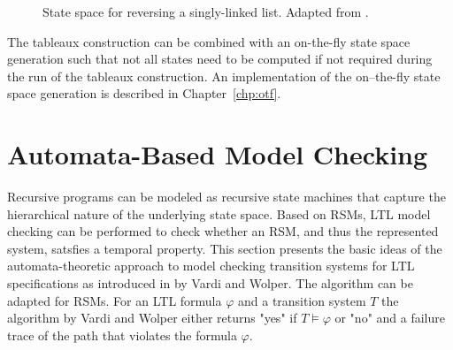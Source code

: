 \documentclass[a4paper, 12pt, twoside]{report}
\begin{document}
\begin{figure}[!h]
\begin{center}
{}
			\caption{State space for reversing a singly-linked list. Adapted from \cite{heinen2015verifyingPhd}.}\label{fig:reverseSLL_tableaux}
		\end{center}
	\end{figure}
	
	The tableaux construction can be combined with an on-the-fly state space generation such that not all states need to be computed if not required during the run of the tableaux construction. An implementation of the on--the-fly state space generation is described in Chapter~\ref{chp:otf}.
	
	\section{Automata-Based Model Checking}\label{sec:automataMC}
	
	Recursive programs can be modeled as recursive state machines that capture the hierarchical nature of the underlying state space. Based on RSMs, LTL model checking can be performed to check whether an RSM, and thus the represented system, satsfies a temporal property. This section presents the basic ideas of the automata-theoretic approach to model checking transition systems for LTL specifications as introduced in \cite{vardi1986automata} by Vardi and Wolper. The algorithm can be adapted for RSMs. For an LTL formula $\varphi$ and a transition system $T$ the algorithm by Vardi and Wolper either returns "yes" if $T \models \varphi$ or "no" and a failure trace of the path that violates the formula $\varphi$. \\
	
\end{document}
